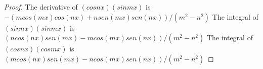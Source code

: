 \begin{proof}
 The derivative of $(cos nx)(sin mx)$ is $-(m cos(m x) cos(n x) + n sen(m x) sen(n x))/(m^2 - n^2)$
 The integral of $(sin nx)(sin mx)$ is $(n cos(n x) sen(m x) - m cos(m x) sen(n x))/(m^2 - n^2)$
 The integral of $(cos nx)(cos mx)$ is $(m cos(n x) sen(m x) - n cos(m x) sen(n x))/(m^2 - n^2)$
\end{proof}